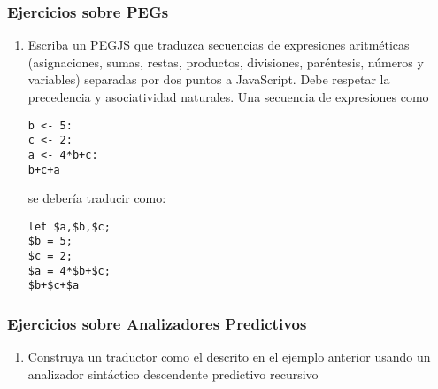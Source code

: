 \subsubsection{Ejercicios sobre PEGs}\label{ejercicios-sobre-pegs}

\begin{enumerate}
\def\labelenumi{\arabic{enumi}.}
\item
  Escriba un PEGJS que traduzca secuencias de expresiones aritméticas
  (asignaciones, sumas, restas, productos, divisiones, paréntesis,
  números y variables) separadas por dos puntos a JavaScript. Debe
  respetar la precedencia y asociatividad naturales. Una secuencia de
  expresiones como

\begin{verbatim}
b <- 5:
c <- 2:
a <- 4*b+c:
b+c+a 
\end{verbatim}

  se debería traducir como:

\begin{verbatim}
let $a,$b,$c;
$b = 5;
$c = 2;
$a = 4*$b+$c;
$b+$c+$a
\end{verbatim}
\end{enumerate}

\subsubsection{Ejercicios sobre Analizadores
Predictivos}\label{ejercicios-sobre-analizadores-predictivos}

\begin{enumerate}
\def\labelenumi{\arabic{enumi}.}
\itemsep1pt\parskip0pt
\item
  Construya un traductor como el descrito en el ejemplo anterior usando
  un analizador sintáctico descendente predictivo recursivo
\end{enumerate}
